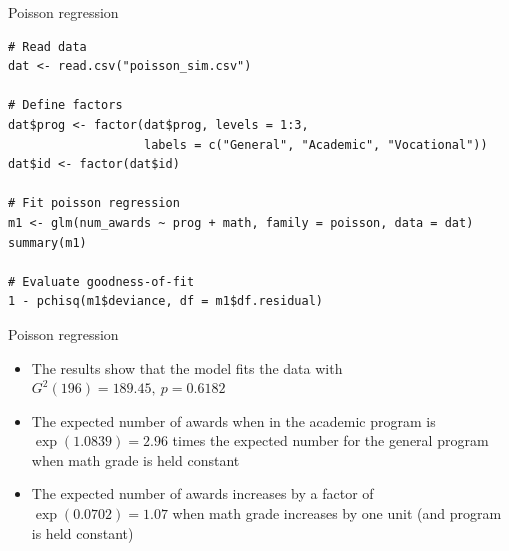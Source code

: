 \documentclass[aspectratio=169]{beamer}
\begin{document}
\begin{frame}[fragile]{Poisson regression}
  \begin{lstlisting}
# Read data
dat <- read.csv("poisson_sim.csv")

# Define factors
dat$prog <- factor(dat$prog, levels = 1:3,
                   labels = c("General", "Academic", "Vocational"))
dat$id <- factor(dat$id)

# Fit poisson regression
m1 <- glm(num_awards ~ prog + math, family = poisson, data = dat)
summary(m1)

# Evaluate goodness-of-fit
1 - pchisq(m1$deviance, df = m1$df.residual)
\end{lstlisting}
\end{frame}

%
%


\begin{frame}{Poisson regression}
\begin{itemize}
  \item The results show that the model fits the data with $G^2(196) =
    189.45,~p=0.6182$
  \item The expected number of awards when in the academic program is
    $\exp(1.0839) = 2.96$ times the expected number for the general program
    when math grade is held constant
  \item The expected number of awards increases by a factor of
    $\exp(0.0702) = 1.07$ when math grade increases by one unit (and
    program is held constant)
\end{itemize}
\end{frame}
\end{document}
